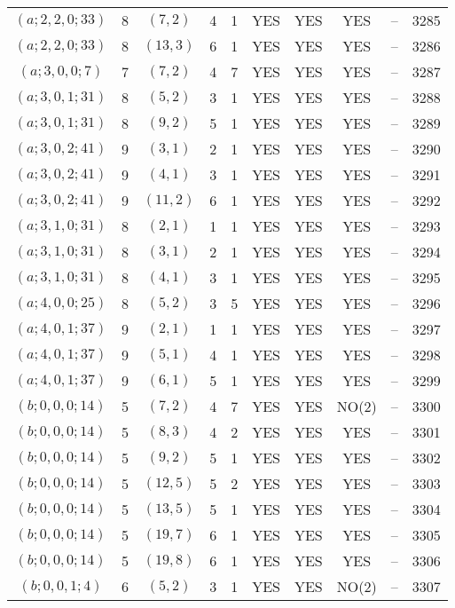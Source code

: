 \begin{longtable}{|c|c|c|c|c|c|c|c|c|c|}
$(a; 2, 2, 0; 33)$ & 8 & $(7, 2)$ & 4 & 1 & YES & YES & YES & -- & 3285\\
$(a; 2, 2, 0; 33)$ & 8 & $(13, 3)$ & 6 & 1 & YES & YES & YES & -- & 3286\\
$(a; 3, 0, 0; 7)$ & 7 & $(7, 2)$ & 4 & 7 & YES & YES & YES & -- & 3287\\
$(a; 3, 0, 1; 31)$ & 8 & $(5, 2)$ & 3 & 1 & YES & YES & YES & -- & 3288\\
$(a; 3, 0, 1; 31)$ & 8 & $(9, 2)$ & 5 & 1 & YES & YES & YES & -- & 3289\\
$(a; 3, 0, 2; 41)$ & 9 & $(3, 1)$ & 2 & 1 & YES & YES & YES & -- & 3290\\
$(a; 3, 0, 2; 41)$ & 9 & $(4, 1)$ & 3 & 1 & YES & YES & YES & -- & 3291\\
$(a; 3, 0, 2; 41)$ & 9 & $(11, 2)$ & 6 & 1 & YES & YES & YES & -- & 3292\\
$(a; 3, 1, 0; 31)$ & 8 & $(2, 1)$ & 1 & 1 & YES & YES & YES & -- & 3293\\
$(a; 3, 1, 0; 31)$ & 8 & $(3, 1)$ & 2 & 1 & YES & YES & YES & -- & 3294\\
$(a; 3, 1, 0; 31)$ & 8 & $(4, 1)$ & 3 & 1 & YES & YES & YES & -- & 3295\\
$(a; 4, 0, 0; 25)$ & 8 & $(5, 2)$ & 3 & 5 & YES & YES & YES & -- & 3296\\
$(a; 4, 0, 1; 37)$ & 9 & $(2, 1)$ & 1 & 1 & YES & YES & YES & -- & 3297\\
$(a; 4, 0, 1; 37)$ & 9 & $(5, 1)$ & 4 & 1 & YES & YES & YES & -- & 3298\\
$(a; 4, 0, 1; 37)$ & 9 & $(6, 1)$ & 5 & 1 & YES & YES & YES & -- & 3299\\
$(b; 0, 0, 0; 14)$ & 5 & $(7, 2)$ & 4 & 7 & YES & YES & NO(2) & -- & 3300\\
$(b; 0, 0, 0; 14)$ & 5 & $(8, 3)$ & 4 & 2 & YES & YES & YES & -- & 3301\\
$(b; 0, 0, 0; 14)$ & 5 & $(9, 2)$ & 5 & 1 & YES & YES & YES & -- & 3302\\
$(b; 0, 0, 0; 14)$ & 5 & $(12, 5)$ & 5 & 2 & YES & YES & YES & -- & 3303\\
$(b; 0, 0, 0; 14)$ & 5 & $(13, 5)$ & 5 & 1 & YES & YES & YES & -- & 3304\\
$(b; 0, 0, 0; 14)$ & 5 & $(19, 7)$ & 6 & 1 & YES & YES & YES & -- & 3305\\
$(b; 0, 0, 0; 14)$ & 5 & $(19, 8)$ & 6 & 1 & YES & YES & YES & -- & 3306\\
$(b; 0, 0, 1; 4)$ & 6 & $(5, 2)$ & 3 & 1 & YES & YES & NO(2) & -- & 3307\\

\end{longtable}

